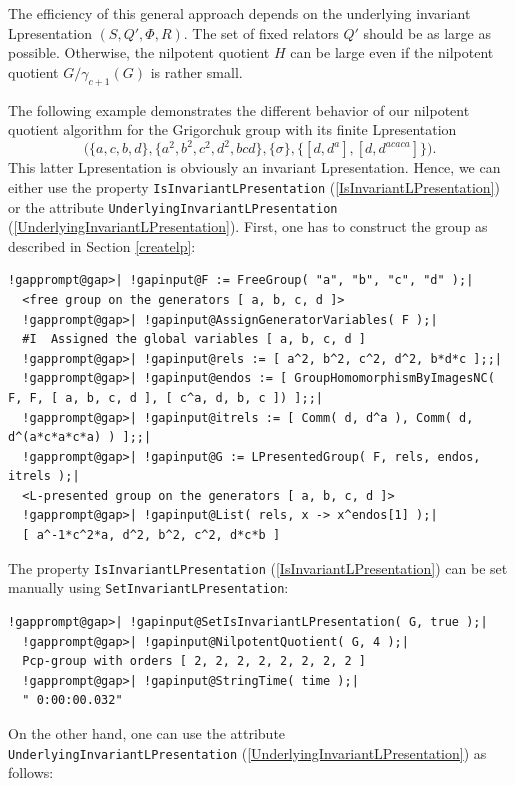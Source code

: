 \documentclass[a4paper,11pt]{report}
\begin{document}
{{ The efficiency of this general approach depends on the underlying invariant
L\texttt{}presentation $(S,Q',\Phi,R)$. The set of fixed relators $Q'$ should be as large as possible. Otherwise, the nilpotent quotient $H$ can be large even if the nilpotent quotient $G/\gamma_{c+1}(G)$ is rather small.

 The following example demonstrates the different behavior of our nilpotent
quotient algorithm for the Grigorchuk group with its finite
L\texttt{}presentation 
\[\Big(\{a,c,b,d\},\{a^2,b^2,c^2,d^2,bcd\},\{\sigma\},\{[d,d^a],[d,d^{acaca}]\}
\Big). \]
 This latter L\texttt{}presentation is obviously an invariant
L\texttt{}presentation. Hence, we can either use the property \texttt{IsInvariantLPresentation} (\ref{IsInvariantLPresentation}) or the attribute \texttt{UnderlyingInvariantLPresentation} (\ref{UnderlyingInvariantLPresentation}). First, one has to construct the group as described in Section \ref{createlp}: 
\begin{Verbatim}[commandchars=!@|,fontsize=\small,frame=single,label=Example]
  !gapprompt@gap>| !gapinput@F := FreeGroup( "a", "b", "c", "d" );|
  <free group on the generators [ a, b, c, d ]>
  !gapprompt@gap>| !gapinput@AssignGeneratorVariables( F );|
  #I  Assigned the global variables [ a, b, c, d ]
  !gapprompt@gap>| !gapinput@rels := [ a^2, b^2, c^2, d^2, b*d*c ];;|
  !gapprompt@gap>| !gapinput@endos := [ GroupHomomorphismByImagesNC( F, F, [ a, b, c, d ], [ c^a, d, b, c ]) ];;|
  !gapprompt@gap>| !gapinput@itrels := [ Comm( d, d^a ), Comm( d, d^(a*c*a*c*a) ) ];;|
  !gapprompt@gap>| !gapinput@G := LPresentedGroup( F, rels, endos, itrels );|
  <L-presented group on the generators [ a, b, c, d ]>
  !gapprompt@gap>| !gapinput@List( rels, x -> x^endos[1] );|
  [ a^-1*c^2*a, d^2, b^2, c^2, d*c*b ]
\end{Verbatim}
 The property \texttt{IsInvariantLPresentation} (\ref{IsInvariantLPresentation}) can be set manually using \texttt{SetInvariantLPresentation}: 
\begin{Verbatim}[commandchars=!@|,fontsize=\small,frame=single,label=Example]
  !gapprompt@gap>| !gapinput@SetIsInvariantLPresentation( G, true );|
  !gapprompt@gap>| !gapinput@NilpotentQuotient( G, 4 );|
  Pcp-group with orders [ 2, 2, 2, 2, 2, 2, 2, 2 ]
  !gapprompt@gap>| !gapinput@StringTime( time );|
  " 0:00:00.032"
\end{Verbatim}
 On the other hand, one can use the attribute \texttt{UnderlyingInvariantLPresentation} (\ref{UnderlyingInvariantLPresentation}) as follows: 
}}
\end{document}
